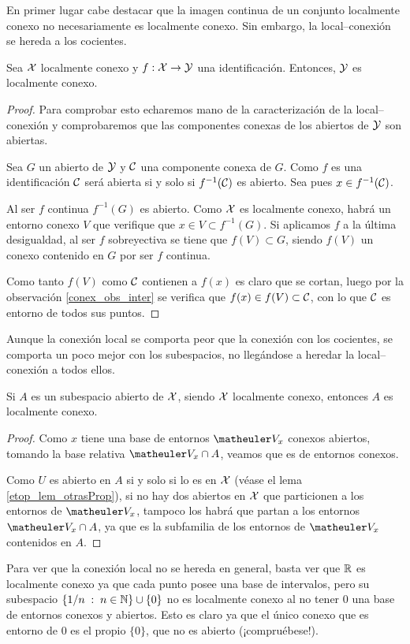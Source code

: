 En primer lugar cabe destacar que la imagen continua de un conjunto localmente conexo no necesariamente es localmente conexo. Sin embargo, la local--conexión se hereda a los cocientes.
\begin{prop}
	\label{conex_prop_cocientes}
	Sea $\mathcal{X}$ localmente conexo y $f:\mathcal{X}\to\mathcal{Y}$ una identificación. Entonces, $\mathcal{Y}$ es localmente conexo.
\end{prop}
\begin{proof}
	Para comprobar esto echaremos mano de la caracterización de la local--conexión y comprobaremos que las componentes conexas de los abiertos de $\mathcal{Y}$ son abiertas.
	
	Sea $G$ un abierto de $\mathcal{Y}$ y $\mathcal{C}$ una componente conexa de $G$. Como $f$ es una identificación $\mathcal{C}$ será abierta si y solo si $f^{-1}(\mathcal{C})$ es abierto. Sea pues $x\in f^{-1}(\mathcal{C})$.
	
	Al ser $f$ continua $f^{-1}(G)$ es abierto. Como $\mathcal{X}$ es localmente conexo, habrá un entorno conexo $V$ que verifique que $x\in V\subset f^{-1}(G)$. Si aplicamos $f$ a la última desigualdad, al ser $f$ sobreyectiva se tiene que $f(V)\subset G$, siendo $f(V)$ un conexo contenido en $G$ por ser $f$ continua.
	
	Como tanto $f(V)$ como $\mathcal{C}$ contienen a $f(x)$ es claro que se cortan, luego por la observación \ref{conex_obs_inter} se verifica que $f(x)\in f(V)\subset \mathcal{C}$, con lo que $\mathcal{C}$ es entorno de todos sus puntos.
\end{proof}
Aunque la conexión local se comporta peor que la conexión con los cocientes, se comporta un poco mejor con los subespacios, no llegándose a heredar la local--conexión a todos ellos.
\begin{lem}
	\label{conex_lem_subesLocal}
	Si $A$ es un subespacio abierto de $\mathcal{X}$, siendo $\mathcal{X}$ localmente conexo, entonces $A$ es localmente conexo.
\end{lem}
\begin{proof}
	Como $x$ tiene una base de entornos $\Va{x}$ conexos abiertos, tomando la base relativa $\Va{x}\cap A$, veamos que es de entornos conexos.
	
	Como $U$ es abierto en $A$ si y solo si lo es en $\mathcal{X}$ (véase el lema \ref{etop_lem_otrasProp}), si no hay dos abiertos en $\mathcal{X}$ que particionen a los entornos de $\Va{x}$, tampoco los habrá que partan a los entornos $\Va{x}\cap A$, ya que es la subfamilia de los entornos de $\Va{x}$ contenidos en $A$.
\end{proof}
\begin{obs}[Contraejemplo]
	Para ver que la conexión local no se hereda en general, basta ver que $\mathbb{R}$ es localmente conexo ya que cada punto posee una base de intervalos, pero su subespacio $\{1/n\;:\; n\in\mathbb{N}\}\cup\{0\}$ no es localmente conexo al no tener $0$ una base de entornos conexos y abiertos. Esto es claro ya que el único conexo que es entorno de $0$ es el propio $\{0\}$, que no es abierto (¡compruébese!).
\end{obs}
